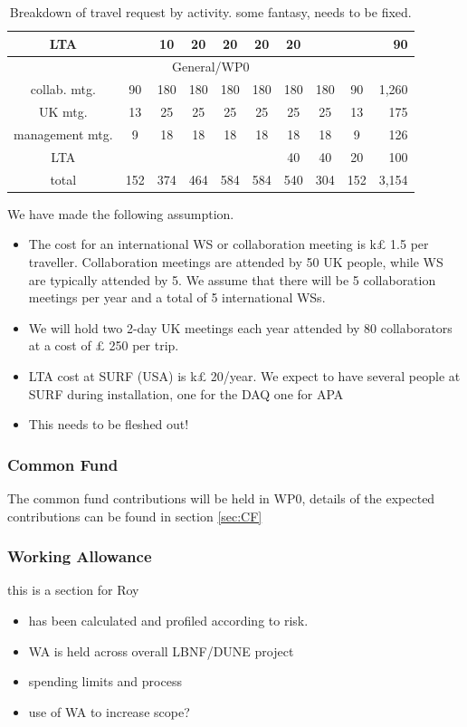 \begin{table}[htb]
\begin{tabular}{|c||c|c|c|c|c|c|c|c||r|}
         LTA           &     & 10  & 20  & 20  & 20  &  20 &    & & 90  \\
         \hline\hline
         \multicolumn{10}{|c|}{General/WP0 }\\
         \hline
         collab. mtg.    &  90 & 180 & 180 & 180 & 180 & 180 & 180 &  90 & 1,260 \\
         UK mtg.         &  13 & 25  &  25 &  25 &  25 &  25 &  25 & 13  & 175   \\
         management mtg. &   9 & 18  &  18 &  18 &  18 &  18 &  18 &   9 & 126  \\
         LTA             &     &     &     &     &     &  40 &  40 &  20 & 100  \\
         \hline
         \hline
         total           & 152 & 374 & 464 & 584 & 584 & 540 & 304 & 152 & 3,154\\
         \hline
    \end{tabular}
    \caption{Breakdown of travel request by activity. \color{red} some fantasy, needs to be fixed.}
    \label{tab:travel}
\end{table}
We have made the following assumption.
\begin{itemize}
    \item The cost for an international WS or collaboration meeting is k£ 1.5 per traveller. Collaboration meetings are attended by 50 UK people, while WS are typically attended by 5.
    We assume that there will be 5 collaboration meetings per year and a total of 5 international WSs.
    \item We will hold two 2-day UK meetings each year attended by 80 collaborators at a cost of £ 250 per trip.
    \item
    LTA cost at SURF (USA) is k£ 20/year. We expect to have several people at SURF during installation, one for the DAQ one for APA
    \item {\color{red} This needs to be fleshed out!}
\end{itemize}

\subsubsection{Common Fund}
The common fund contributions will be held in WP0, details of the expected contributions can be found in section \ref{sec:CF}

\subsubsection{Working Allowance}

{\color{red}this is a section for Roy}

\begin{itemize}
    \item has been calculated and profiled according to risk.
    \item WA is held across overall LBNF/DUNE project
    \item spending limits and process
    \item use of WA to increase scope?
\end{itemize}


